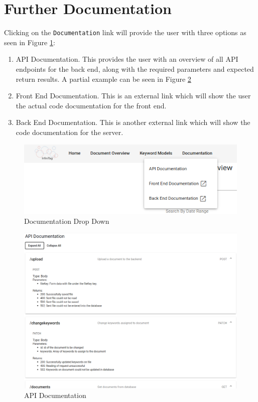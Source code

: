 \documentclass{article}
\begin{document}
\section{Further Documentation}
Clicking on the \verb|Documentation| link will provide the user with three options as seen in Figure \ref{fig:doc_drop}:

\begin{enumerate}
    \item API Documentation. This provides the user with an overview of all API endpoints for the back end, along with the required parameters and expected return results. A partial example can be seen in Figure \ref{fig:apidoc}
    \item Front End Documentation. This is an external link which will show the user the actual code documentation for the front end.
    \item Back End Documentation. This is another external link which will show the code documentation for the server.
\end{enumerate}

\begin{figure}
    \centering
    \includegraphics[scale=0.4]{img/doc3.png}
    \caption{Documentation Drop Down}
    \label{fig:doc_drop}
\end{figure}

\begin{figure}
    \centering
    \includegraphics[scale=0.4]{img/api1.png}
    \caption{API Documentation}
    \label{fig:apidoc}
\end{figure}
\end{document}
